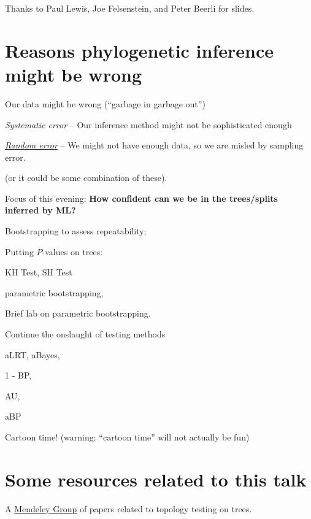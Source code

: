 \documentclass[landscape]{foils}
\begin{document}
\myNewSlide
\huge 
Thanks to Paul Lewis, Joe Felsenstein, and Peter Beerli for slides.

\myNewSlide
\section*{Reasons phylogenetic inference might be wrong}
\Large
\begin{compactenum}
	\item Our data might be wrong (``garbage in garbage out'')
	\item {\em Systematic error} -- Our inference method might not be sophisticated enough
	\item \underline{{\em Random error}} -- We might not have enough data, so we are misled by sampling error.
\end{compactenum}

(or it could be some combination of these).

{Focus of this evening: {\bf How confident can we be in the trees/splits inferred by ML?}}

\myNewSlide
\begin{compactenum}
	\item Bootstrapping to assess repeatability;
	\item Putting $P$-values on trees:
	\begin{compactitem}
		\item KH Test, SH Test
		\item parametric bootstrapping,
	\end{compactitem}
	\item Brief lab on parametric bootstrapping.
	\item Continue the onslaught of testing methods
	\begin{compactitem}
		\item aLRT, aBayes,
		\item 1 - BP,
		\item AU,
		\item aBP
	\end{compactitem}
	\item Cartoon time! ({\small warning: ``cartoon time'' will not actually be fun})
\end{compactenum}

\myNewSlide
\section*{Some resources related to this talk}
A \href{http://www.mendeley.com/groups/1275263/confidence-on-phylogenetic-trees/}{Mendeley Group} of papers related to topology testing on trees.
\end{document}
